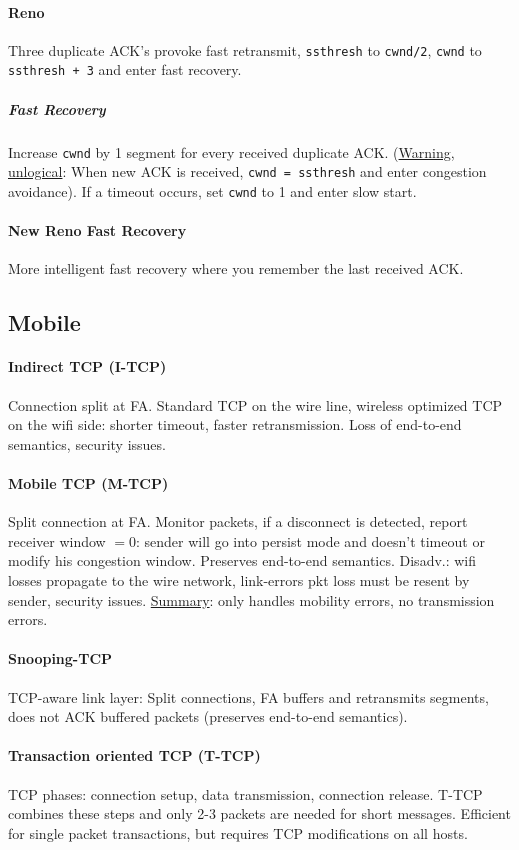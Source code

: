 \documentclass[6pt]{scrartcl}
\begin{document}
\begin{multicols}{4}
\paragraph{Reno} Three duplicate ACK's provoke fast retransmit, \texttt{ssthresh} to \texttt{cwnd/2}, \texttt{cwnd} to \texttt{ssthresh + 3} and enter fast recovery.

\subparagraph{Fast Recovery} Increase \texttt{cwnd} by 1 segment for every received duplicate ACK. (\underline{Warning, unlogical}: When new ACK is received, \texttt{cwnd = ssthresh} and enter congestion avoidance). If a timeout occurs, set \texttt{cwnd} to 1 and enter slow start.
\paragraph{New Reno Fast Recovery} More intelligent fast recovery where you remember the last received ACK.

\subsection{Mobile}
\paragraph{Indirect TCP (I-TCP)} Connection split at FA. Standard TCP on the wire line, wireless optimized TCP on the wifi side: shorter timeout, faster retransmission. Loss of end-to-end semantics, security issues.
\paragraph{Mobile TCP (M-TCP)} Split connection at FA. Monitor packets, if a disconnect is detected, report receiver window $= 0$: sender will go into persist mode and doesn't timeout or modify his congestion window. Preserves end-to-end semantics. Disadv.: wifi losses propagate to the wire network, link-errors pkt loss must be resent by sender, security issues. \underline{Summary}: only handles mobility errors, no transmission errors.

\paragraph{Snooping-TCP} TCP-aware link layer: Split connections, FA buffers and retransmits segments, does not ACK buffered packets (preserves end-to-end semantics).

\paragraph{Transaction oriented TCP (T-TCP)} TCP phases: connection setup, data transmission, connection release. T-TCP combines these steps and only 2-3 packets are needed for short messages. Efficient for single packet transactions, but requires TCP modifications on all hosts.


\end{multicols}
\end{document}
